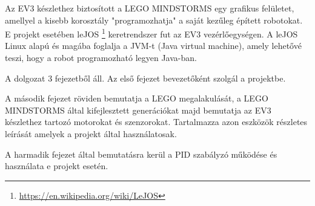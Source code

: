 Az EV3 készlethez biztosított a LEGO MINDSTORMS egy grafikus felületet, amellyel a kisebb korosztály "programozhatja" a saját kezűleg épített robotokat. E projekt esetében leJOS \footnote{\href {https://en.wikipedia.org/wiki/LeJOS}{https://en.wikipedia.org/wiki/LeJOS}} keretrendszer fut az EV3 vezérlőegységen. A leJOS Linux alapú és magába foglalja a JVM-t (Java virtual machine), amely lehetővé teszi, hogy a robot programozható legyen Java-ban. 

A dolgozat 3 fejezetből áll. Az első fejezet bevezetőként szolgál a projektbe.

A második fejezet röviden bemutatja a LEGO megalakulását, a LEGO MINDSTORMS által kifejlesztett generációkat majd bemutatja az EV3 készlethez tartozó motorokat és szenzorokat. Tartalmazza azon eszközök részletes leírását amelyek a projekt által használatosak.

A harmadik fejezet által bemutatásra kerül a PID szabályzó működése és használata e projekt esetén.